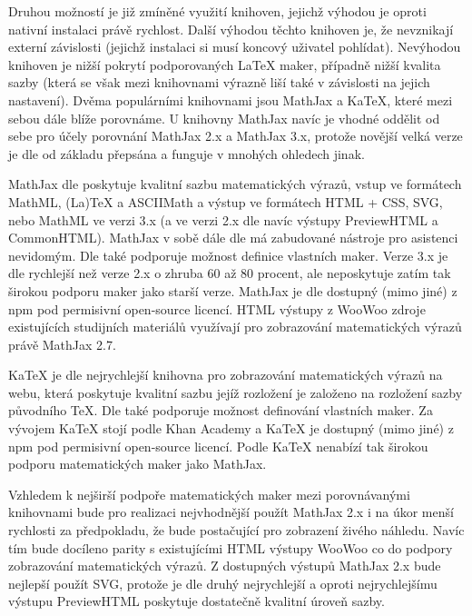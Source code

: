 Druhou možností je již zmíněné využití knihoven, jejichž výhodou je oproti nativní instalaci právě rychlost. Další
výhodou těchto knihoven je, že nevznikají externí závislosti (jejichž instalaci si musí koncový uživatel pohlídat).
Nevýhodou knihoven je nižší pokrytí podporovaných \LaTeX{} maker, případně nižší kvalita sazby (která se však mezi
knihovnami výrazně liší také v závislosti na jejich nastavení). Dvěma populárními knihovnami jsou MathJax a KaTeX, které
mezi sebou dále blíže porovnáme. U knihovny MathJax navíc je vhodné oddělit od sebe pro účely porovnání MathJax 2.x a
MathJax 3.x, protože novější velká verze je dle \cite{mathjax3-docs} od základu přepsána a funguje v mnohých ohledech
jinak.

MathJax dle \cite{mathjax} poskytuje kvalitní sazbu matematických výrazů, vstup ve formátech MathML, (La)TeX a ASCIIMath
a výstup ve formátech HTML + CSS, SVG, nebo MathML ve verzi 3.x (a ve verzi 2.x dle \cite{mathjax2-docs} navíc výstupy
PreviewHTML a CommonHTML). MathJax v sobě dále dle \cite{mathjax} má zabudované nástroje pro asistenci nevidomým. Dle
\cite{mathjax3-docs} také podporuje možnost definice vlastních maker. Verze 3.x je dle \cite{mathjax3-docs} rychlejší
než verze 2.x o zhruba 60 až 80 procent, ale neposkytuje zatím tak širokou podporu maker jako starší verze. MathJax je
dle \cite{mathjax3-docs} dostupný (mimo jiné) z npm pod permisivní open-source licencí. HTML výstupy \cite{pkm} z WooWoo
zdroje existujících studijních materiálů využívají pro zobrazování matematických výrazů právě MathJax 2.7.

KaTeX je dle \cite{katex} nejrychlejší knihovna pro zobrazování matematických výrazů na webu, která poskytuje kvalitní
sazbu jejíž rozložení je založeno na rozložení sazby původního \TeX{}. Dle \cite{katex-docs} také podporuje možnost
definování vlastních maker. Za vývojem KaTeX stojí podle \cite{katex} Khan Academy a KaTeX je dostupný (mimo jiné) z npm
pod permisivní open-source licencí. Podle \cite{danmackinlay} KaTeX nenabízí tak širokou podporu matematických maker
jako MathJax.

Vzhledem k nejširší podpoře matematických maker mezi porovnávanými knihovnami bude pro realizaci nejvhodnější použít
MathJax 2.x i na úkor menší rychlosti za předpokladu, že bude postačující pro zobrazení živého náhledu. Navíc tím bude
docíleno parity s existujícími HTML výstupy WooWoo co do podpory zobrazování matematických výrazů. Z dostupných výstupů
MathJax 2.x bude nejlepší použít SVG, protože je dle \cite{mathjax2-docs} druhý nejrychlejší a oproti nejrychlejšímu
výstupu PreviewHTML poskytuje dostatečně kvalitní úroveň sazby.

